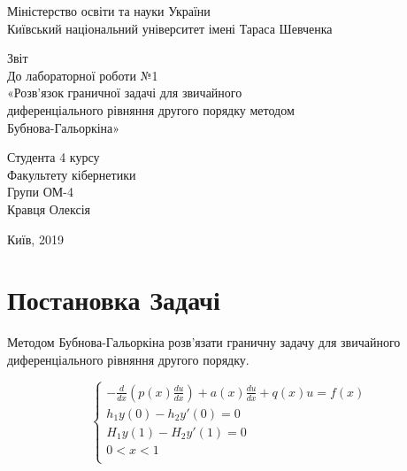 \documentclass[14pt,a4paper]{scrartcl}
\begin{document}
	\begin{titlepage}
		\begin{center}
			\small{Міністерство освіти та науки України}\\
			\small{Київський національний університет імені Тараса Шевченка}\\
		\end{center}
			\vspace{15em}
		\begin{center}
			\large{Звіт}\\
			\large{До лабораторної роботи №1}\\
			\large{«Розв’язок граничної задачі для звичайного}\\
			\large{диференціального рівняння  другого порядку методом}\\
			\large{Бубнова-Гальоркіна»}\\
			
		\end{center}
			
		\vspace{10em}
		

	
		\begin{flushright}
			Студента 4 курсу\\
			Факультету кібернетики\\
			Групи ОМ-4\\
			Кравця Олексія\\
			
		\end{flushright}
		
		\vspace{\fill}

		
		\begin{center}
			\small{Київ, 2019}
		\end{center}
	
	\end{titlepage}


	\newpage

	\section{Постановка Задачі}
	Методом Бубнова-Гальоркіна розв'язати граничну задачу для звичайного диференціального рівняння другого порядку.

	
	\begin{equation}\label{eq1}
		\begin{cases}
			-\frac{d}{dx}(p(x)\frac{du}{dx})+a(x)\frac{du}{dx}+q(x)u=f(x)  \\ 
			h_1y(0) - h_2y'(0) =0 \\
			H_1y(1) - H_2y'(1) =0 \\
			0<x<1\\
		\end{cases}
	\end{equation}
	
\end{document}
